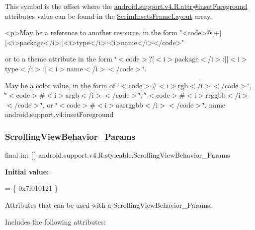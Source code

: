 This symbol is the offset where the \hyperlink{classandroid_1_1support_1_1v4_1_1R_1_1attr_acc9e3a4e14d94e134cd2db9c8793285e}{android.\+support.\+v4.\+R.\+attr\#inset\+Foreground} attribute\textquotesingle{}s value can be found in the \hyperlink{classandroid_1_1support_1_1v4_1_1R_1_1styleable_a7e7d8d13fae500e42bc330c6a6214a98}{Scrim\+Insets\+Frame\+Layout} array.

\begin{DoxyVerb}      <p>May be a reference to another resource, in the form "<code>@[+][<i>package</i>:]<i>type</i>:<i>name</i></code>"
\end{DoxyVerb}
 or to a theme attribute in the form \char`\"{}$<$code$>$?\mbox{[}$<$i$>$package$<$/i$>$\+:\mbox{]}\mbox{[}$<$i$>$type$<$/i$>$\+:\mbox{]}$<$i$>$name$<$/i$>$$<$/code$>$\char`\"{}. 

May be a color value, in the form of \char`\"{}$<$code$>$\#$<$i$>$rgb$<$/i$>$$<$/code$>$\char`\"{}, \char`\"{}$<$code$>$\#$<$i$>$argb$<$/i$>$$<$/code$>$\char`\"{}, \char`\"{}$<$code$>$\#$<$i$>$rrggbb$<$/i$>$$<$/code$>$\char`\"{}, or \char`\"{}$<$code$>$\#$<$i$>$aarrggbb$<$/i$>$$<$/code$>$\char`\"{}.  name android.\+support.\+v4\+:inset\+Foreground \mbox{\label{classandroid_1_1support_1_1v4_1_1R_1_1styleable_a6d0733db2ccefc6d9526c8cfa4b29ea2}} 
\subsubsection{\texorpdfstring{Scrolling\+View\+Behavior\+\_\+\+Params}{ScrollingViewBehavior\_Params}}
{\footnotesize\ttfamily final int \mbox{[}$\,$\mbox{]} android.\+support.\+v4.\+R.\+styleable.\+Scrolling\+View\+Behavior\+\_\+\+Params\hspace{0.3cm}{\ttfamily [static]}}

{\bfseries Initial value\+:}
\begin{DoxyCode}
= \{
            0x7f010121
        \}
\end{DoxyCode}
Attributes that can be used with a Scrolling\+View\+Behavior\+\_\+\+Params. 

Includes the following attributes\+:

